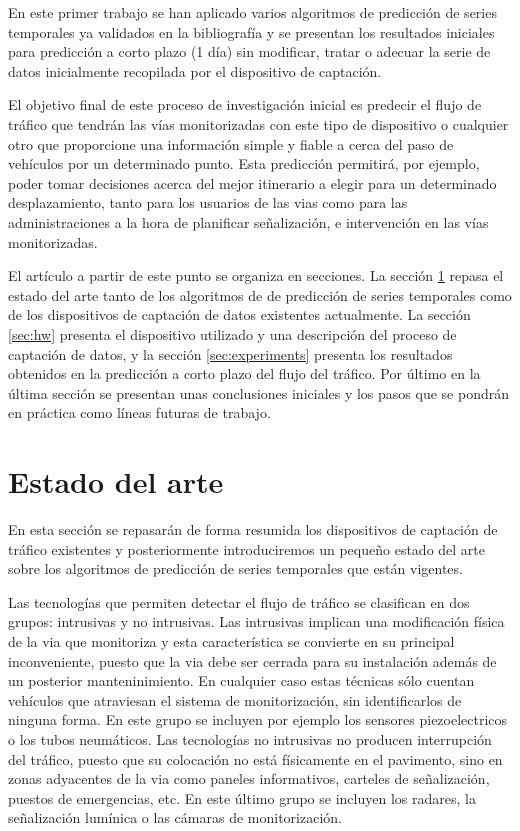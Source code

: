 \documentclass[runningheads]{llncs}
\begin{document}
En este primer trabajo se han aplicado varios algoritmos de predicción de series temporales ya
validados en la bibliografía y se presentan los resultados iniciales para predicción a corto plazo
(1 día) sin modificar, tratar o adecuar la serie de datos inicialmente recopilada por el dispositivo
de captación. 

El objetivo final de este proceso de investigación inicial es predecir el flujo de tráfico que
tendrán las vías monitorizadas con este tipo de dispositivo o cualquier otro que proporcione una
información simple y fiable a cerca del paso de vehículos por un determinado punto. Esta predicción
permitirá, por ejemplo, poder tomar decisiones
acerca del mejor itinerario a elegir para un determinado desplazamiento, tanto para los usuarios
de las vias como para las administraciones a la hora de planificar señalización, e intervención en
las vías monitorizadas.

El artículo a partir de este punto se organiza en secciones. La sección \ref{sec:soa} repasa el
estado del arte tanto de los algoritmos de de predicción de series temporales como de los
dispositivos de captación de datos existentes actualmente. La sección \ref{sec:hw} presenta el
dispositivo utilizado y una descripción del proceso de captación de datos, y la sección
\ref{sec:experiments} presenta los resultados obtenidos en la
predicción a corto plazo del flujo del tráfico. Por último en la última sección se presentan
unas conclusiones iniciales y los pasos que se pondrán en práctica como líneas
futuras de trabajo.


\section{Estado del arte}
\label{sec:soa}

En esta sección se repasarán de forma resumida los dispositivos de captación de tráfico existentes
y posteriormente introduciremos un pequeño estado del arte sobre los algoritmos de predicción de
series temporales que están vigentes. 


Las tecnologías que permiten detectar el flujo de tráfico se clasifican en dos grupos:
intrusivas y no intrusivas.  Las intrusivas implican una modificación física de la via que
monitoriza y esta característica se convierte en su principal inconveniente, puesto que la via debe
ser cerrada para su instalación además de un posterior manteninimiento.  En cualquier caso estas
técnicas sólo cuentan vehículos que atraviesan el sistema de monitorización, sin identificarlos de
ninguna forma. En este grupo se incluyen por ejemplo los sensores piezoelectricos o los tubos
neumáticos. Las tecnologías no intrusivas no producen interrupción del tráfico, puesto que su
colocación no está físicamente en el pavimento, sino en zonas adyacentes de la via como paneles
informativos, carteles de señalización, puestos de emergencias, etc.  En este último grupo se
incluyen los radares, la señalización lumínica o las cámaras de monitorización. 
\end{document}
